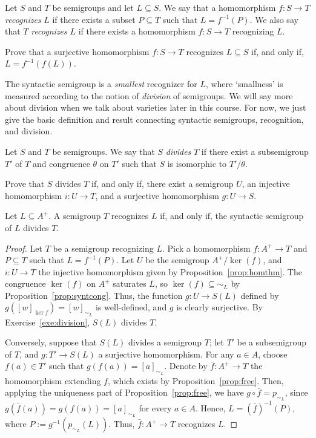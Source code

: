 \begin{definition}
Let $S$ and $T$ be semigroups and let $L \subseteq S$. We say that a homomorphism $f \colon S \to T$ \emph{recognizes} $L$ if there exists a subset $P \subseteq T$ such that $L = f^{-1}(P)$. We also say that $T$ \emph{recognizes} $L$ if there exists a homomorphism $f \colon S \to T$ recognizing $L$.
\end{definition}
\begin{exercise}\easy
  Prove that a surjective homomorphism $f \colon S \to T$ recognizes $L \subseteq S$ if, and only if, $L = f^{-1}(f(L))$.
\end{exercise}

The syntactic semigroup is a \emph{smallest} recognizer for $L$, where `smallness' is measured according to the notion of \emph{division} of semigroups. We will say more about division when we talk about varieties later in this course. For now, we just give the basic definition and result connecting syntactic semigroups, recognition, and division.
\begin{definition}
  Let $S$ and $T$ be semigroups. We say that $S$ \emph{divides} $T$ if there exist a subsemigroup $T'$ of $T$ and congruence $\theta$ on $T'$ such that $S$ is isomorphic to $T'/{\theta}$.
\end{definition}
\begin{exercise}\easy\label{exe:division}
Prove that $S$ divides $T$ if, and only if, there exist a semigroup $U$, an injective homomorphism $i \colon U \to T$, and a surjective homomorphism $g \colon U \to S$. 
\end{exercise}
\begin{proposition}
  Let $L \subseteq A^+$. A semigroup $T$ recognizes $L$ if, and only if, the syntactic semigroup of $L$ divides $T$.
\end{proposition}
\begin{proof}
  Let $T$ be a semigroup recognizing $L$. Pick a homomorphism $f \colon A^+ \to T$ and $P \subseteq T$ such that $L = f^{-1}(P)$. Let $U$ be the semigroup $A^+/{\ker(f)}$, and $i \colon U \to T$ the injective homomorphism given by Proposition~\ref{prop:homthm}. The congruence $\ker(f)$ on $A^+$ saturates $L$, so $\ker(f) \subseteq {\sim_L}$ by Proposition~\ref{prop:syntcong}. Thus, the function $g \colon U \to S(L)$ defined by $g([w]_{\ker{f}}) = [w]_{\sim_L}$ is well-defined, and $g$ is clearly surjective. By Exercise~\ref{exe:division}, $S(L)$ divides $T$.
 
  Conversely, suppose that $S(L)$ divides a semigroup $T$; let $T'$ be a subsemigroup of $T$,  and $g \colon T' \to S(L)$ a surjective homomorphism. For any $a \in A$, choose $f(a) \in T'$ such that $g(f(a)) = [a]_{\sim_L}$. Denote by $\bar{f} \colon A^+ \to T$ the homomorphism extending $f$, which exists by Proposition~\ref{prop:free}. Then, applying the uniqueness part of Proposition~\ref{prop:free}, we have $g \circ \bar{f} = p_{\sim_L}$, since $g(\bar{f}(a)) = g(f(a)) = [a]_{\sim_L}$ for every $a \in A$. Hence, $L = (\bar{f})^{-1}(P)$, where $P := g^{-1}(p_{\sim_L}(L))$. Thus, $\bar{f} \colon A^+ \to T$ recognizes $L$.
\end{proof}

